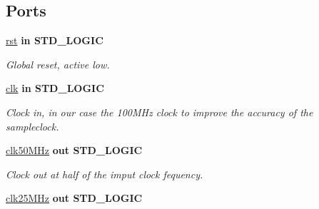 \subsection*{Ports}
 \begin{DoxyCompactItemize}
\item 
\hypertarget{classclk__divide_aa7b7040844189161771c36cf6bbf172c}{\hyperlink{classclk__divide_aa7b7040844189161771c36cf6bbf172c}{rst}  {\bfseries {\bfseries \textcolor{vhdlkeyword}{in}\textcolor{vhdlchar}{ }}} {\bfseries \textcolor{comment}{S\-T\-D\-\_\-\-L\-O\-G\-I\-C}\textcolor{vhdlchar}{ }} }\label{classclk__divide_aa7b7040844189161771c36cf6bbf172c}

\begin{DoxyCompactList}\small\item\em Global reset, active low. \end{DoxyCompactList}\item 
\hypertarget{classclk__divide_a8120037e0ee47c35ba2d79242209c72e}{\hyperlink{classclk__divide_a8120037e0ee47c35ba2d79242209c72e}{clk}  {\bfseries {\bfseries \textcolor{vhdlkeyword}{in}\textcolor{vhdlchar}{ }}} {\bfseries \textcolor{comment}{S\-T\-D\-\_\-\-L\-O\-G\-I\-C}\textcolor{vhdlchar}{ }} }\label{classclk__divide_a8120037e0ee47c35ba2d79242209c72e}

\begin{DoxyCompactList}\small\item\em Clock in, in our case the 100\-M\-Hz clock to improve the accuracy of the sampleclock. \end{DoxyCompactList}\item 
\hypertarget{classclk__divide_ab1f1a3ab1ab8a22adc572d22c78e6370}{\hyperlink{classclk__divide_ab1f1a3ab1ab8a22adc572d22c78e6370}{clk50\-M\-Hz}  {\bfseries {\bfseries \textcolor{vhdlkeyword}{out}\textcolor{vhdlchar}{ }}} {\bfseries \textcolor{comment}{S\-T\-D\-\_\-\-L\-O\-G\-I\-C}\textcolor{vhdlchar}{ }} }\label{classclk__divide_ab1f1a3ab1ab8a22adc572d22c78e6370}

\begin{DoxyCompactList}\small\item\em Clock out at half of the imput clock fequency. \end{DoxyCompactList}\item 
\hypertarget{classclk__divide_af312c161ed7113c4b513d173c2d4d010}{\hyperlink{classclk__divide_af312c161ed7113c4b513d173c2d4d010}{clk25\-M\-Hz}  {\bfseries {\bfseries \textcolor{vhdlkeyword}{out}\textcolor{vhdlchar}{ }}} {\bfseries \textcolor{comment}{S\-T\-D\-\_\-\-L\-O\-G\-I\-C}\textcolor{vhdlchar}{ }} }\label{classclk__divide_af312c161ed7113c4b513d173c2d4d010}


\end{DoxyCompactItemize}
